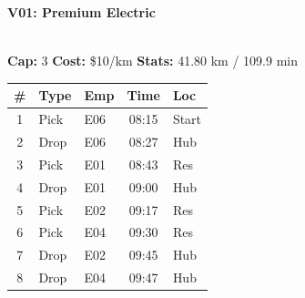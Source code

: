 \documentclass[a4paper,11pt]{article}
\begin{document}
\noindent
\begin{minipage}[t]{0.49\textwidth}
    \centering
    \colorbox{velorablue}{\parbox{\dimexpr\linewidth-2\fboxsep}{\centering \color{white}\large\textbf{V01: Premium Electric}}} \\
    \vspace{0.1cm}
    {\small \textbf{Cap:} 3 \quad \textbf{Cost:} \$10/km \quad \textbf{Stats:} 41.80 km / 109.9 min}
    
    \vspace{0.2cm}
    
    \renewcommand{\arraystretch}{1.2}
    \begin{tabular}{c l l c l}
        \toprule
        \textbf{\#} & \textbf{Type} & \textbf{Emp} & \textbf{Time} & \textbf{Loc} \\
        \midrule
        1 & \color{velorablue}Pick & E06 & 08:15 & Start \\
        \rowcolor{headergray} 2 & Drop & E06 & 08:27 & Hub \\
        3 & \color{velorablue}Pick & E01 & 08:43 & Res \\
        \rowcolor{headergray} 4 & Drop & E01 & 09:00 & Hub \\
        5 & \color{velorablue}Pick & E02 & 09:17 & Res \\
        \rowcolor{headergray} 6 & \color{velorablue}Pick & E04 & 09:30 & Res \\
        7 & Drop & E02 & 09:45 & Hub \\
        \rowcolor{headergray} 8 & Drop & E04 & 09:47 & Hub \\
        \bottomrule
    \end{tabular}
\end{minipage}
\hfill
\end{document}
